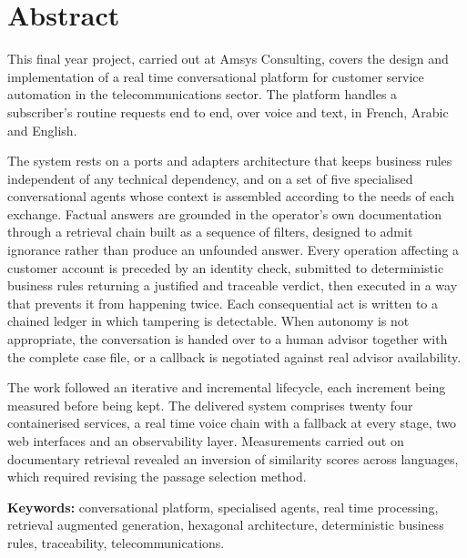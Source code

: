 \newpage

\chapter*{Abstract}
\thispagestyle{empty}

This final year project, carried out at Amsys Consulting, covers the design and implementation of a real time conversational platform for customer service automation in the telecommunications sector. The platform handles a subscriber's routine requests end to end, over voice and text, in French, Arabic and English.

The system rests on a ports and adapters architecture that keeps business rules independent of any technical dependency, and on a set of five specialised conversational agents whose context is assembled according to the needs of each exchange. Factual answers are grounded in the operator's own documentation through a retrieval chain built as a sequence of filters, designed to admit ignorance rather than produce an unfounded answer. Every operation affecting a customer account is preceded by an identity check, submitted to deterministic business rules returning a justified and traceable verdict, then executed in a way that prevents it from happening twice. Each consequential act is written to a chained ledger in which tampering is detectable. When autonomy is not appropriate, the conversation is handed over to a human advisor together with the complete case file, or a callback is negotiated against real advisor availability.

The work followed an iterative and incremental lifecycle, each increment being measured before being kept. The delivered system comprises twenty four containerised services, a real time voice chain with a fallback at every stage, two web interfaces and an observability layer. Measurements carried out on documentary retrieval revealed an inversion of similarity scores across languages, which required revising the passage selection method.

\bigskip
\noindent\textbf{Keywords:} conversational platform, specialised agents, real time processing, retrieval augmented generation, hexagonal architecture, deterministic business rules, traceability, telecommunications.

